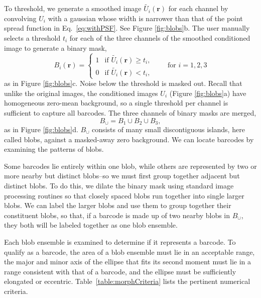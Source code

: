  To threshold, we generate a smoothed image $\tilde{U_i}(\mathbf{r})$ for each channel by convolving $U_i$ with a gaussian whose width is narrower than that of the point spread function in Eq.~\ref{eq:withPSF}. See  Figure \ref{fig:blobs}b. The user manually selects a threshold $t_i$ for each of the three channels of the smoothed conditioned image to generate a binary mask,
\begin{equation}
	B_i(\mathbf{r}) = \left\{
	\begin{array}{rl}
		 1 & \text{if } \tilde{U_i}(\mathbf{r}) \geq t_i,\\
		 0 & \text{if } \tilde{U_i}(\mathbf{r}) < t_i,
	\end{array} \right. \qquad\text{for } i=1,2,3
\end{equation}
as in Figure \ref{fig:blobs}c. Noise below the threshold is masked out. Recall that unlike the original images, the conditioned images $U_i$  (Figure \ref{fig:blobs}a) have homogeneous zero-mean  background, so a single threshold per channel is sufficient to capture all barcodes. The three channels of binary masks are merged, 
\begin{equation}
B_{\cup}=B_1\cup B_2 \cup B_3, 
\end{equation}
as in Figure \ref{fig:blobs}d. $B_\cup$ consists of many small discontiguous islands, here called blobs, against a masked-away zero background.  We can locate barcodes by examining the patterns of blobs.

Some barcodes lie entirely within one blob, while others are represented by two or more nearby but distinct blobs--so we must first  group together adjacent but distinct blobs.  To do this, we dilate the binary mask using standard image processing routines \citep{matlab_version_2010} so that closely spaced blobs run together into single larger blobs. We can label the larger blobs and use them to group together their constituent blobs, so that, if a barcode is made up of two nearby blobs in $B_\cup$, they both will be labeled together as one blob ensemble.

Each blob ensemble is examined to determine if it represents a barcode. To qualify as a barcode, the area of a blob ensemble must lie in an acceptable range, the major and minor axis of the ellipse that fits its second moment must lie in a range consistent with that of a barcode, and the ellipse must be sufficiently elongated or eccentric. Table~\ref{table:morphCriteria} lists the pertinent numerical criteria. 

